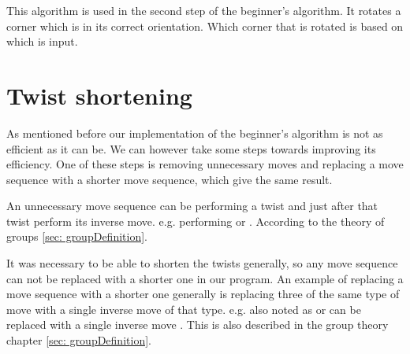 This algorithm is used in the second step of the beginner's algorithm. It rotates a corner \cpiece{} which is in its correct orientation. Which corner that is rotated is based on which is input. 









\section{Twist shortening}
As mentioned before our implementation of the beginner's algorithm is not as efficient as it can be. We can however take some steps towards improving its efficiency. One of these steps is removing unnecessary moves and replacing a move sequence with a shorter move sequence, which give the same result.

An unnecessary move sequence can be performing a twist and just after that twist perform its inverse move. e.g. performing  or .
According to the theory of groups \ref{sec: groupDefinition}.

It was necessary to be able to shorten the twists generally, so any move sequence can not be replaced with a shorter one in our program.
An example of replacing a move sequence with a shorter one generally is replacing three of the same type of move with a single inverse move of that type. e.g.  also noted as  or  can be replaced with a single inverse move . This is also described in the group theory chapter \ref{sec: groupDefinition}.